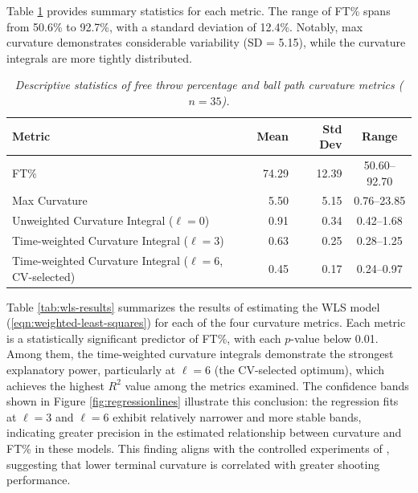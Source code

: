 \documentclass{article}
\begin{document}
    Table \ref{tab:summary-stats} provides summary statistics for each metric. The range of FT\% spans from 50.6\% to 92.7\%, with a standard deviation of 12.4\%. Notably, max curvature demonstrates considerable variability (SD = 5.15), while the curvature integrals are more tightly distributed.

    \begin{table}[H]
        \centering
        \begin{tabular}{lrrc}
        \toprule
        \textbf{Metric} & \textbf{Mean} & \textbf{Std Dev} & \textbf{Range} \\
        \midrule
        FT\% & 74.29 & 12.39 & 50.60--92.70 \\
        Max Curvature & 5.50 & 5.15 & 0.76--23.85 \\
        Unweighted Curvature Integral ($\ell=0$) & 0.91 & 0.34 & 0.42--1.68 \\
        Time-weighted Curvature Integral ($\ell=3$) & 0.63 & 0.25 & 0.28--1.25 \\
        Time-weighted Curvature Integral ($\ell=6$, CV-selected) & 0.45 & 0.17 & 0.24--0.97 \\ %
        \bottomrule
        \end{tabular}
        \caption{\it Descriptive statistics of free throw percentage and ball path curvature metrics ($n = 35$).}
        \label{tab:summary-stats}
    \end{table}

    Table \ref{tab:wls-results} summarizes the results of estimating the WLS model (\ref{eqn:weighted-least-squares}) for each of the four curvature metrics. Each metric is a statistically significant predictor of FT\%, with each $p$-value below 0.01. Among them, the time-weighted curvature integrals demonstrate the strongest explanatory power, particularly at $\ell = 6$ (the CV-selected optimum), which achieves the highest $R^2$ value among the metrics examined. The confidence bands shown in Figure \ref{fig:regressionlines} illustrate this conclusion: the regression fits at $\ell = 3$ and $\ell = 6$ exhibit relatively narrower and more stable bands, indicating greater precision in the estimated relationship between curvature and FT\% in these models. This finding aligns with the controlled experiments of \citet{slegers_role_2024}, suggesting that lower terminal curvature is correlated with greater shooting performance.
\end{document}
